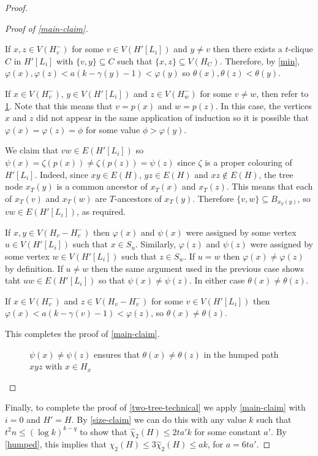 \documentclass[kpfonts]{patmorin}
\newcommand{\trn}{\chi_2}
\newcommand{\htrn}{\hat{\chi}_2}
\theoremstyle{named}
\begin{document}
\begin{proof}
\begin{proof}[Proof of \cref{main-claim}]
\begin{compactenum}
          \item If $x,z\in V(H^-_v)$ for some $v\in V(H'[L_i])$ and $y\neq v$ then there exists a $t$-clique $C$ in $H'[L_i]$ with $\{v,y\}\subseteq C$ such that $\{x,z\}\subseteq V(H_C)$.  Therefore, by \cref{min}, $\varphi(x),\varphi(z)<a(k-\gamma(y)-1) < \varphi(y)$ so $\theta(x),\theta(z) < \theta(y)$.

          \item If $x\in V(H^-_{v})$, $y\in V(H'[L_i])$ and $z\in V(H^-_w)$ for some $v\neq w$, then refer to \cref{proper}.  Note that this means that $v=p(x)$ and $w=p(z)$.  In this case, the vertices $x$ and $z$ did not appear in the same application of induction so it is possible that $\varphi(x)=\varphi(z)=\phi$ for some value $\phi>\varphi(y)$.

          We claim that $vw\in E(H'[L_i])$ so $\psi(x)=\zeta(p(x))\neq\zeta(p(z))=\psi(z)$ since $\zeta$ is a proper colouring of $H'[L_i]$.  Indeed,  since $xy\in E(H)$, $yz\in E(H)$ and $xz\not\in E(H)$, the tree node $x_T(y)$ is a common ancestor of $x_T(x)$ and $x_T(z)$.  This means that each of $x_T(v)$ and $x_T(w)$ are $T$-ancestors of $x_T(y)$. Therefore $\{v,w\}\subseteq B_{x_T(y)}$, so $vw\in E(H'[L_i])$, as required.

          \item If $x,y\in V(H_v-H^-_v)$ then $\varphi(x)$ and $\psi(x)$ were assigned by some vertex $u\in V(H'[L_i])$ such that $x\in S_{u}$.  Similarly, $\varphi(z)$ and $\psi(z)$ were assigned by some vertex $w\in V(H'[L_i])$ such that $z\in S_{w}$.  If $u=w$ then $\varphi(x)\neq\varphi(z)$ by definition.  If $u\neq w$ then the same argument used in the previous case shows taht $uw\in E(H'[L_i])$ so that $\psi(x)\neq \psi(z)$.  In either case $\theta(x)\neq\theta(z)$.

          \item If $x\in V(H^-_{v})$ and $z\in V(H_v-H^-_{v})$ for some $v\in V(H'[L_i])$ then $\varphi(x)<a(k-\gamma(v)-1) < \varphi(z)$, so $\theta(x)\neq\theta(z)$.
      \end{compactenum}
      This completes the proof of \cref{main-claim}.
       \begin{figure}
           \caption{$\psi(x)\neq\psi(z)$ ensures that $\theta(x)\neq \theta(z)$ in the humped path $xyz$ with $x\in H_x$}
           \label{proper}
       \end{figure}
    \end{proof}
    Finally, to complete the proof of \cref{two-tree-technical} we apply \cref{main-claim} with $i=0$ and $H'=H$.  By \cref{size-claim} we can do this with any value $k$ such that $t^2n \le (\log k)^{k-q}$ to show that $\htrn(H)\le 2ta'k$ for some constant $a'$.  By \cref{humped}, this implies that $\trn(H)\le 3\htrn(H)\le ak$, for $a=6ta'$.
\end{proof}
\end{document}
